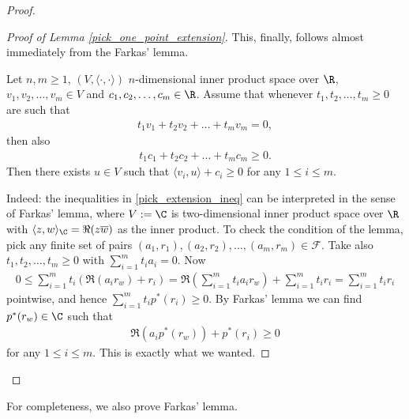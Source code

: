 \begin{proof}
\begin{proof}[Proof of Lemma \ref{pick_one_point_extension}]
		This, finally, follows almost immediately from the Farkas' lemma.
		\begin{lem}\label{farkas_lemma}
			Let $n, m \geq 1$, $(V, \langle \cdot, \cdot \rangle)$ $n$-dimensional inner product space over $\R$, $v_{1}, v_{2}, \ldots, v_{m} \in V$ and $c_{1}, c_{2}, \ldots, c_{m} \in \R$. Assume that whenever $t_{1}, t_{2}, \ldots, t_{m} \geq 0$ are such that
			\begin{align*}
				t_{1} v_{1} + t_{2} v_{2} + \ldots + t_{m} v_{m} = 0,
			\end{align*}
			then also
			\begin{align*}
				t_{1} c_{1} + t_{2} c_{2} + \ldots + t_{m} c_{m} \geq 0.
			\end{align*}
			Then there exists $u \in V$ such that $\langle v_{i}, u\rangle + c_{i} \geq 0$ for any $1 \leq i \leq m$.
		\end{lem}
		Indeed: the inequalities in \ref{pick_extension_ineq} can be interpreted in the sense of Farkas' lemma, where $V := \C$ is two-dimensional inner product space over $\R$ with $\langle z, w \rangle_{\C} = \Re(z \overline{w})$ as the inner product. To check the condition of the lemma, pick any finite set of pairs $(a_{1}, r_{1}), (a_{2}, r_{2}), \ldots, (a_{m}, r_{m}) \in \mathcal{F}$. Take also $t_{1}, t_{2}, \ldots, t_{m} \geq 0$ with $\sum_{i = 1}^{m} t_{i} a_{i} = 0$. Now
		\begin{align*}
			0 \leq \sum_{i = 1}^{m} t_{i} \left(\Re(a_{i} r_{w}) + r_{i}\right) = \Re\left(\sum_{i = 1}^{m} t_{i} a_{i} r_{w}\right) + \sum_{i = 1}^{m} t_{i} r_{i} = \sum_{i = 1}^{m} t_{i} r_{i}
		\end{align*}
		pointwise, and hence $\sum_{i = 1}^{m} t_{i} p^{*}(r_{i}) \geq 0$. By Farkas' lemma we can find $p^{*}(r_{w}) \in \C$ such that
		\begin{align*}
			\Re(a_{i} p^{*}(r_{w})) + p^{*}(r_{i}) \geq 0
		\end{align*}
		for any $1 \leq i \leq m$. This is exactly what we wanted.
	\end{proof}
\end{proof}

For completeness, we also prove Farkas' lemma.

